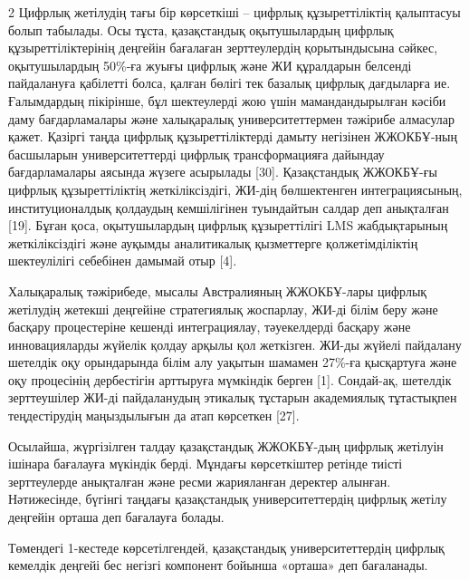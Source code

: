 \begin{multicols}{2}
Цифрлық жетілудің тағы бір көрсеткіші -- цифрлық құзыреттіліктің
қалыптасуы болып табылады. Осы тұста, қазақстандық оқытушылардың цифрлық
құзыреттіліктерінің деңгейін бағалаған зерттеулердің қорытындысына
сәйкес, оқытушылардың 50\%-ға жуығы цифрлық және ЖИ құралдарын белсенді
пайдалануға қабілетті болса, қалған бөлігі тек базалық цифрлық
дағдыларға ие. Ғалымдардың пікірінше, бұл шектеулерді жою үшін
мамандандырылған кәсіби даму бағдарламалары және халықаралық
университеттермен тәжірибе алмасулар қажет. Қазіргі таңда цифрлық
құзыреттіліктерді дамыту негізінен ЖЖОКБҰ-ның басшыларын
университеттерді цифрлық трансформацияға дайындау бағдарламалары аясында
жүзеге асырылады {[}30{]}. Қазақстандық ЖЖОКБҰ-ғы цифрлық
құзыреттіліктің жеткіліксіздігі, ЖИ-дің бөлшектенген интеграциясының,
институционалдық қолдаудың кемшілігінен туындайтын салдар деп анықталған
{[}19{]}. Бұған қоса, оқытушылардың цифрлық құзыреттілігі LMS
жабдықтарының жеткіліксіздігі және ауқымды аналитикалық қызметтерге
қолжетімділіктің шектеулілігі себебінен дамымай отыр {[}4{]}.

Халықаралық тәжірибеде, мысалы Австралияның ЖЖОКБҰ-лары цифрлық
жетілудің жетекші деңгейіне стратегиялық жоспарлау, ЖИ-ді білім беру
және басқару процестеріне кешенді интеграциялау, тәуекелдерді басқару
және инновацияларды жүйелік қолдау арқылы қол жеткізген. ЖИ-ды жүйелі
пайдалану шетелдік оқу орындарында білім алу уақытын шамамен 27\%-ға
қысқартуға және оқу процесінің дербестігін арттыруға мүмкіндік берген
{[}1{]}. Сондай-ақ, шетелдік зерттеушілер ЖИ-ді пайдаланудың этикалық
тұстарын академиялық тұтастықпен теңдестірудің маңыздылығын да атап
көрсеткен {[}27{]}.

Осылайша, жүргізілген талдау қазақстандық ЖЖОКБҰ-дың цифрлық жетілуін
ішінара бағалауға мүкіндік берді. Мұндағы көрсеткіштер ретінде тиісті
зерттеулерде анықталған және ресми жарияланған деректер алынған.
Нәтижесінде, бүгінгі таңдағы қазақстандық университеттердің цифрлық
жетілу деңгейін орташа деп бағалауға болады.

Төмендегі 1-кестеде көрсетілгендей, қазақстандық университеттердің
цифрлық кемелдік деңгейі бес негізгі компонент бойынша «орташа» деп
бағаланады.
\end{multicols}

